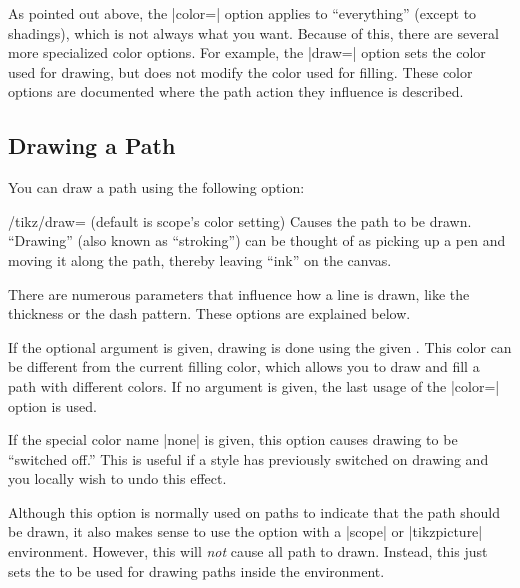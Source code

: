 As pointed out above, the |color=| option applies to ``everything''
(except to shadings), which is not always what you want. Because of
this, there are several more specialized color options. For example,
the |draw=| option sets the color used for drawing, but does not
modify the color used for filling. These color options are documented
where the path action they influence is described.


\subsection{Drawing a Path}

You can draw a path using the following option:
\begin{key}{/tikz/draw= (default \normalfont is scope's color setting)}
  Causes the path to be drawn. ``Drawing'' (also known as
  ``stroking'') can be thought of as picking up a pen and moving it
  along the path, thereby leaving ``ink'' on the canvas.

  There are numerous parameters that influence how a line is drawn,
  like the thickness or the dash pattern. These options are explained
  below.

  If the optional  argument is given, drawing is done
  using the given . This color can be different from the
  current filling color, which allows you to draw and fill a path with
  different colors. If no  argument is given, the last
  usage of the |color=| option is used.

  If the special color name |none| is given, this option causes
  drawing to be ``switched off.'' This is useful if a style has
  previously switched on drawing and you locally wish to undo this
  effect.

  Although this option is normally used on paths to indicate that the
  path should be drawn, it also makes sense to use the option with a
  |{scope}| or |{tikzpicture}| environment. However, this will
  \emph{not} cause all path to drawn. Instead, this just sets the
   to be used for drawing paths inside the environment.

\begin{codeexample}[]
\end{codeexample}
\end{key}


